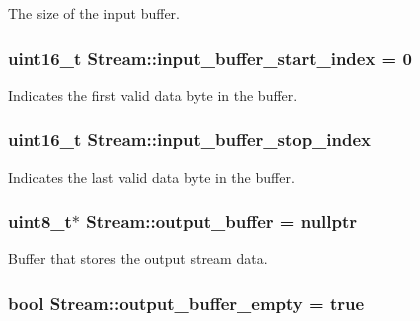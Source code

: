 The size of the input buffer. \hypertarget{class_stream_a6fc009e9e71fa92cbbf9b407ede82a73}{
\subsubsection[{input\-\_\-buffer\-\_\-start\-\_\-index}]{\setlength{\rightskip}{0pt plus 5cm}uint16\-\_\-t Stream\-::input\-\_\-buffer\-\_\-start\-\_\-index = 0\hspace{0.3cm}{\ttfamily [protected]}}}\label{class_stream_a6fc009e9e71fa92cbbf9b407ede82a73}
Indicates the first valid data byte in the buffer. \hypertarget{class_stream_aaceece6a2defd1f7d9667fcc0be03a7a}{
\subsubsection[{input\-\_\-buffer\-\_\-stop\-\_\-index}]{\setlength{\rightskip}{0pt plus 5cm}uint16\-\_\-t Stream\-::input\-\_\-buffer\-\_\-stop\-\_\-index\hspace{0.3cm}{\ttfamily [protected]}}}\label{class_stream_aaceece6a2defd1f7d9667fcc0be03a7a}
Indicates the last valid data byte in the buffer. \hypertarget{class_stream_a3cd072a10ad5c1b6308dd2da2cdbec71}{
\subsubsection[{output\-\_\-buffer}]{\setlength{\rightskip}{0pt plus 5cm}uint8\-\_\-t$\ast$ Stream\-::output\-\_\-buffer = nullptr\hspace{0.3cm}{\ttfamily [protected]}}}\label{class_stream_a3cd072a10ad5c1b6308dd2da2cdbec71}
Buffer that stores the output stream data. \hypertarget{class_stream_a54b21caaee0001e44968fb70d0a591f5}{
\subsubsection[{output\-\_\-buffer\-\_\-empty}]{\setlength{\rightskip}{0pt plus 5cm}bool Stream\-::output\-\_\-buffer\-\_\-empty = true\hspace{0.3cm}{\ttfamily [protected]}}}\label{class_stream_a54b21caaee0001e44968fb70d0a591f5}

